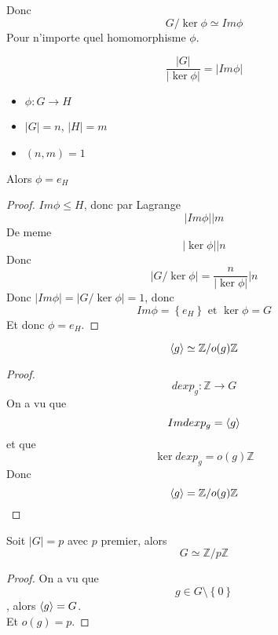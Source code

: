 \documentclass[../main.tex]{subfiles}
\begin{document}
\begin{crly}
Donc
\[ 
G / \ker \phi \simeq Im \phi
\]
Pour n'importe quel homomorphisme $\phi$.
\end{crly}
\begin{crly}
\[ 
\frac{|G|}{|\ker\phi|}= |Im\phi|
\]
\end{crly}
\begin{crly}
\begin{itemize}
\item $\phi: G \to H$ 
\item $|G|= n$, $|H|= m$ 
\item $( n,m) =1$
\end{itemize}
Alors $\phi = e_H$
\end{crly}
\begin{proof}
$Im \phi \leq H$, donc par Lagrange 
\[ 
|Im\phi| \big\vert m
\]
De meme
\[ 
|\ker \phi| \big \vert n
\]
Donc 
\[ 
| G / \ker \phi | = \frac{n}{|\ker \phi|}\big \vert n
\]
Donc  $|Im \phi| = | G / \ker \phi| = 1$, donc 
\[ 
Im \phi = \left\{ e_H \right\} \text{ et } \ker \phi = G
\]
Et donc $\phi = e_H$.

\end{proof}
\begin{crly}
\[ 
	\left\langle g\right\rangle \simeq \mathbb{Z} / o( g) \mathbb{Z}
\]

\end{crly}
\begin{proof}
\[ 
dexp_g: \mathbb{Z} \to G
\]
On a vu que 
\[ 
	Im dexp_g = \left\langle g\right\rangle
\]
et que 
\[ 
	\ker dexp_g = o( g)  \mathbb{Z}
\]
Donc
\[ 
	\left\langle g\right\rangle = \mathbb{Z} / o( g)  \mathbb{Z}
\]

\end{proof}
\begin{crly}
Soit $|G|= p$ avec $p$ premier, alors
\[ 
G \simeq \mathbb{Z} / p \mathbb{Z}
\]

\end{crly}
\begin{proof}
On a vu que
\[ 
g \in G \setminus \left\{ 0 \right\} 
\]
, alors $\left\langle g\right\rangle = G$.\\
Et $o( g) = p$.
\end{proof}
\end{document}
